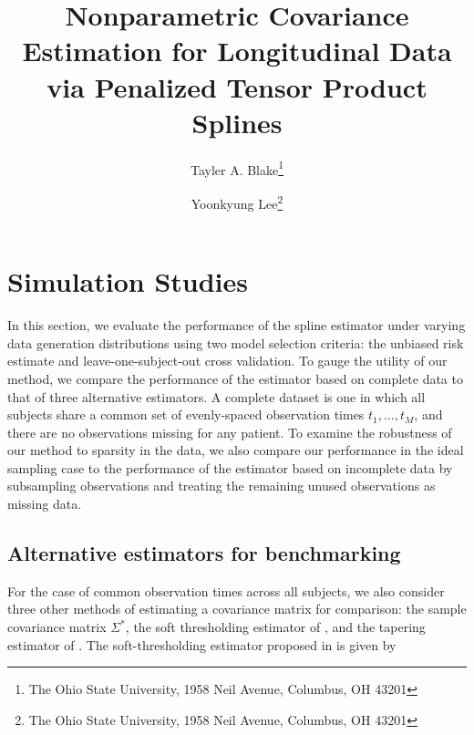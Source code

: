 \documentclass[12pt]{article}
\theoremstyle{definition}
\def\bL{\mathbf{L}}
\begin{document}
\def\bL{\mathbf{L}}



\title{ Nonparametric Covariance Estimation for Longitudinal Data via Penalized Tensor Product Splines}

\author{Tayler A. Blake\thanks{The Ohio State University, 1958 Neil Avenue, Columbus, OH 43201} \and  Yoonkyung Lee\thanks{The Ohio State University, 1958 Neil Avenue, Columbus, OH 43201}}


\maketitle

\section{Simulation Studies}


In this section, we evaluate the performance of the spline estimator under varying data generation distributions using two model selection criteria: the unbiased risk estimate and leave-one-subject-out cross validation. To gauge the utility of our method, we compare the performance of the estimator based on complete data to that of  three alternative estimators.  A complete dataset is one in which all subjects share a common set of evenly-spaced observation times $t_1, \dots, t_M$, and there are no observations missing for any patient. To examine the robustness of our method to sparsity in the data, we also compare our performance in the ideal sampling case to the performance of the estimator based on incomplete data by subsampling observations and treating the remaining unused observations as missing data. 

\subsection{Alternative estimators for benchmarking}

For the case of common observation times across all subjects, we also consider three other methods of estimating a covariance matrix for comparison: the sample covariance matrix $\Sigma^*$, the soft thresholding estimator of \citet{rothman2009generalized}, and the tapering estimator of \citet{cai2010optimal}. The soft-thresholding estimator proposed in \citet{rothman2009generalized} is given by
\end{document}
